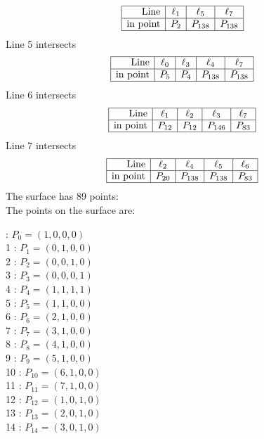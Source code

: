 \documentclass{article}
\begin{document}
{$$
\begin{array}{|r*{3}{|c}|}
\hline
\mbox{Line}  & \ell_{1} & \ell_{5} & \ell_{7}\\
\hline
\mbox{in point}  & P_{2} & P_{138} & P_{138}\\
\hline
\end{array}
$$
Line 5 intersects 
$$
\begin{array}{|r*{4}{|c}|}
\hline
\mbox{Line}  & \ell_{0} & \ell_{3} & \ell_{4} & \ell_{7}\\
\hline
\mbox{in point}  & P_{5} & P_{4} & P_{138} & P_{138}\\
\hline
\end{array}
$$
Line 6 intersects 
$$
\begin{array}{|r*{4}{|c}|}
\hline
\mbox{Line}  & \ell_{1} & \ell_{2} & \ell_{3} & \ell_{7}\\
\hline
\mbox{in point}  & P_{12} & P_{12} & P_{146} & P_{83}\\
\hline
\end{array}
$$
Line 7 intersects 
$$
\begin{array}{|r*{4}{|c}|}
\hline
\mbox{Line}  & \ell_{2} & \ell_{4} & \ell_{5} & \ell_{6}\\
\hline
\mbox{in point}  & P_{20} & P_{138} & P_{138} & P_{83}\\
\hline
\end{array}
$$
The surface has 89 points:\\
The points on the surface are:\\
\begin{multicols}{3}
 : $P_{0}=( 1, 0, 0, 0 )$\\
1 : $P_{1}=( 0, 1, 0, 0 )$\\
2 : $P_{2}=( 0, 0, 1, 0 )$\\
3 : $P_{3}=( 0, 0, 0, 1 )$\\
4 : $P_{4}=( 1, 1, 1, 1 )$\\
5 : $P_{5}=( 1, 1, 0, 0 )$\\
6 : $P_{6}=( 2, 1, 0, 0 )$\\
7 : $P_{7}=( 3, 1, 0, 0 )$\\
8 : $P_{8}=( 4, 1, 0, 0 )$\\
9 : $P_{9}=( 5, 1, 0, 0 )$\\
10 : $P_{10}=( 6, 1, 0, 0 )$\\
11 : $P_{11}=( 7, 1, 0, 0 )$\\
12 : $P_{12}=( 1, 0, 1, 0 )$\\
13 : $P_{13}=( 2, 0, 1, 0 )$\\
14 : $P_{14}=( 3, 0, 1, 0 )$\\

\end{multicols}}
\end{document}
